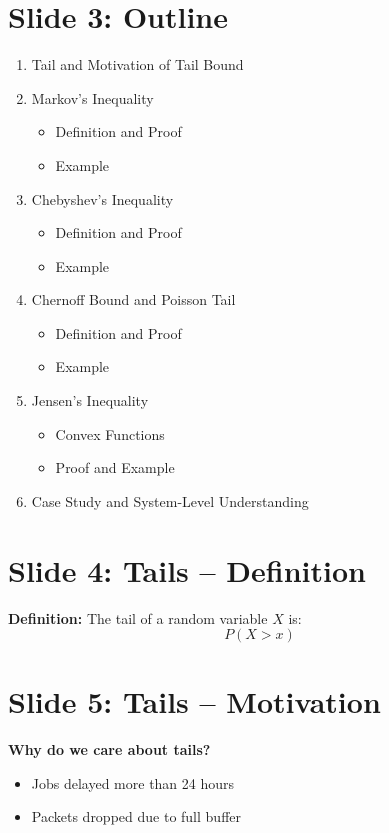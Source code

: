 \documentclass[12pt]{article}
\begin{document}
\section*{Slide 3: Outline}
\begin{enumerate}
\item Tail and Motivation of Tail Bound  
\item Markov’s Inequality  
\begin{itemize}
\item Definition and Proof  
\item Example  
\end{itemize}
\item Chebyshev’s Inequality  
\begin{itemize}
\item Definition and Proof  
\item Example  
\end{itemize}
\item Chernoff Bound and Poisson Tail  
\begin{itemize}
\item Definition and Proof  
\item Example  
\end{itemize}
\item Jensen’s Inequality  
\begin{itemize}
\item Convex Functions  
\item Proof and Example  
\end{itemize}
\item Case Study and System-Level Understanding  
\end{enumerate}

\section*{Slide 4: Tails – Definition}
\textbf{Definition:}  
The tail of a random variable \( X \) is:
\[
P(X > x)
\]

\section*{Slide 5: Tails – Motivation}
\textbf{Why do we care about tails?}
\begin{itemize}
\item Jobs delayed more than 24 hours  
\item Packets dropped due to full buffer  
\end{itemize}
\end{document}
